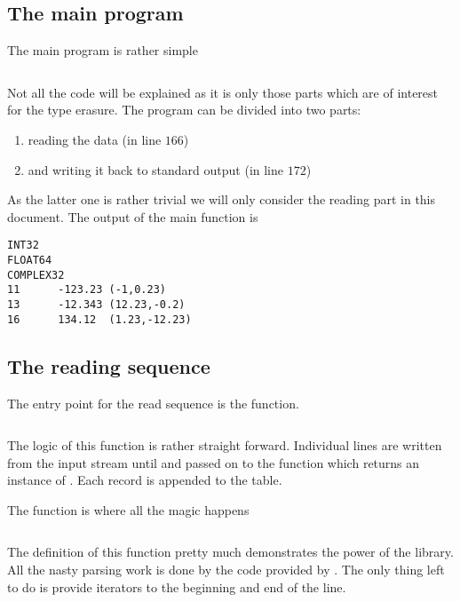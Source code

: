 \subsection{The main program}

The main program is rather simple 
\inputminted[linenos,
             fontsize=\small,
             firstnumber=162,
             firstline=162,
             lastline=175,
             frame=lines,
             label=examples/type\_erasure\_record.cpp
             ]
{cpp}{../examples/type_erasure_record.cpp}
Not all the code will be explained as it is only those parts which are of
interest for the  type erasure.
The program can be divided into two parts:
\begin{enumerate}
\item reading the data (in line $166$) 
\item and writing it back to standard output (in line $172$)
\end{enumerate}
As the latter one is rather trivial we will only consider the reading part in
this document. The output of the main function is 
\begin{verbatim}
INT32
FLOAT64
COMPLEX32
11      -123.23 (-1,0.23)
13      -12.343 (12.23,-0.2)
16      134.12  (1.23,-12.23)
\end{verbatim}

\subsection{The reading sequence}

The entry point for the read sequence is the  function.
\inputminted[linenos,
             fontsize=\small,
             firstnumber=128,
             firstline=128,
             lastline=141,
             frame=lines,
             label=examples/type\_erasure\_record.cpp
             ]
{cpp}{../examples/type_erasure_record.cpp}
The logic of this function is rather straight forward. Individual lines are
written from the input stream until  and passed on to the
 function which returns an instance of . 
Each record is appended to the table. 

The  function is where all the magic happens
\inputminted[linenos,
             fontsize=\small,
             firstnumber=112,
             firstline=112,
             lastline=123,
             frame=lines,
             label=examples/type\_erasure\_record.cpp
             ]
{cpp}{../examples/type_erasure_record.cpp}
The definition of this function pretty much demonstrates the power of the
 library. All the nasty parsing work is done by the code 
provided by . The only thing left to do is provide iterators
to the beginning and end of the line.


